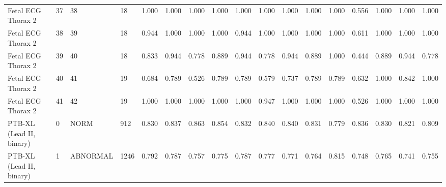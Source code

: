 \begin{longtable}{lllllllllllllllll}
Fetal ECG Thorax 2 & 37 & 38 & 18 & 1.000 & 1.000 & 1.000 & 1.000 & 1.000 & 1.000 & 1.000 & 1.000 & 1.000 & 0.556 & 1.000 & 1.000 & 1.000 \\
Fetal ECG Thorax 2 & 38 & 39 & 18 & 0.944 & 1.000 & 1.000 & 1.000 & 0.944 & 1.000 & 1.000 & 1.000 & 1.000 & 0.611 & 1.000 & 1.000 & 1.000 \\
Fetal ECG Thorax 2 & 39 & 40 & 18 & 0.833 & 0.944 & 0.778 & 0.889 & 0.944 & 0.778 & 0.944 & 0.889 & 1.000 & 0.444 & 0.889 & 0.944 & 0.778 \\
Fetal ECG Thorax 2 & 40 & 41 & 19 & 0.684 & 0.789 & 0.526 & 0.789 & 0.789 & 0.579 & 0.737 & 0.789 & 0.789 & 0.632 & 1.000 & 0.842 & 1.000 \\
Fetal ECG Thorax 2 & 41 & 42 & 19 & 1.000 & 1.000 & 1.000 & 1.000 & 1.000 & 0.947 & 1.000 & 1.000 & 1.000 & 0.526 & 1.000 & 1.000 & 1.000 \\
PTB-XL (Lead II, binary) & 0 & NORM & 912 & 0.830 & 0.837 & 0.863 & 0.854 & 0.832 & 0.840 & 0.840 & 0.831 & 0.779 & 0.836 & 0.830 & 0.821 & 0.809 \\
PTB-XL (Lead II, binary) & 1 & ABNORMAL & 1246 & 0.792 & 0.787 & 0.757 & 0.775 & 0.787 & 0.777 & 0.771 & 0.764 & 0.815 & 0.748 & 0.765 & 0.741 & 0.755 \\
\end{longtable}
